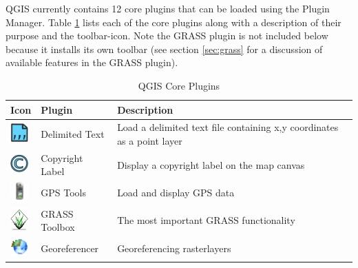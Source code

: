 QGIS currently contains 12 core plugins that can be loaded using the Plugin Manager.
Table \ref{tab:core_plugins} lists each of the core plugins along with a description of their purpose and the toolbar-icon.
Note the GRASS plugin is not included below because it installs its own toolbar (see section \ref{sec:grass} for a discussion of available features in the GRASS plugin).

\begin{minipage}{\textwidth}
\begin{table}[H]
\centering
\caption{QGIS Core Plugins}\label{tab:core_plugins}\medskip
\small
 \begin{tabular}{|l|l|p{4in}|}
\hline \textbf{Icon} & \textbf{Plugin} & \textbf{Description} \\
\hline 
\includegraphics[width=0.7cm]{plugins_delimited_text_images/delimited_text}
 & Delimited Text \index{plugins!delimited text}& Load a delimited text file containing x,y coordinates as a point layer \\
\hline 
\includegraphics[width=0.7cm]{plugins_decorations_images/copyright_label}
 & Copyright Label \index{plugins!copyright}& Display a copyright label on the map canvas\\
\hline 
\includegraphics[width=0.7cm]{plugins_gps_images/gps_importer}
 & GPS Tools \index{plugins!gps}& Load and display GPS data \\
\hline
\includegraphics[width=0.7cm]{plugins_grass_module_images/grasslogo}
 & GRASS Toolbox \index{plugins!grass}& The most important GRASS functionality \\
\hline
\includegraphics[width=0.7cm]{plugins_georeferencer_images/georeferencer}
 & Georeferencer \index{plugin!georeferencer} & Georeferencing rasterlayers \\

\end{tabular}
\end{table}
\end{minipage}
